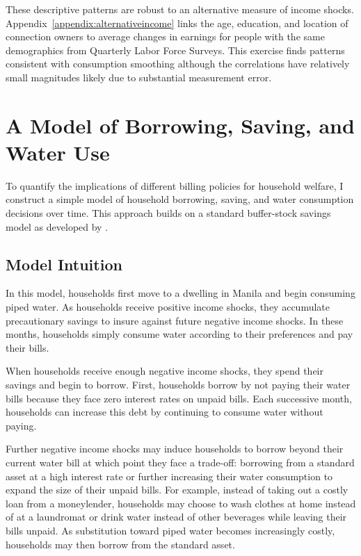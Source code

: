 \documentclass[12pt,table]{article}
\begin{document}
These descriptive patterns are robust to an alternative measure of income shocks.  Appendix~\ref{appendix:alternativeincome} links the age, education, and location of connection owners to average changes in earnings for people with the same demographics from Quarterly Labor Force Surveys.  This exercise finds patterns consistent with consumption smoothing although the correlations have relatively small magnitudes likely due to substantial measurement error.


\section{A Model of Borrowing, Saving, and Water Use}\label{section:model}

To quantify the implications of different billing policies for household welfare, I construct a simple model of household borrowing, saving, and water consumption decisions over time.  This approach builds on a standard buffer-stock savings model as developed by \cite{deaton1991saving}.

\subsection{Model Intuition}

In this model, households first move to a dwelling in Manila and begin consuming piped water.  As households receive positive income shocks, they accumulate precautionary savings to insure against future negative income shocks.  In these months, households simply consume water according to their preferences and pay their bills.

When households receive enough negative income shocks, they spend their savings and begin to borrow.  First, households borrow by not paying their water bills because they face zero interest rates on unpaid bills.  Each successive month, households can increase this debt by continuing to consume water without paying.

Further negative income shocks may induce households to borrow beyond their current water bill at which point they face a trade-off: borrowing from a standard asset at a high interest rate or further increasing their water consumption to expand the size of their unpaid bills.  For example, instead of taking out a costly loan from a moneylender, households may choose to wash clothes at home instead of at a laundromat or drink water instead of other beverages while leaving their bills unpaid.  As substitution toward piped water becomes increasingly costly, households may then borrow from the standard asset.
\end{document}
